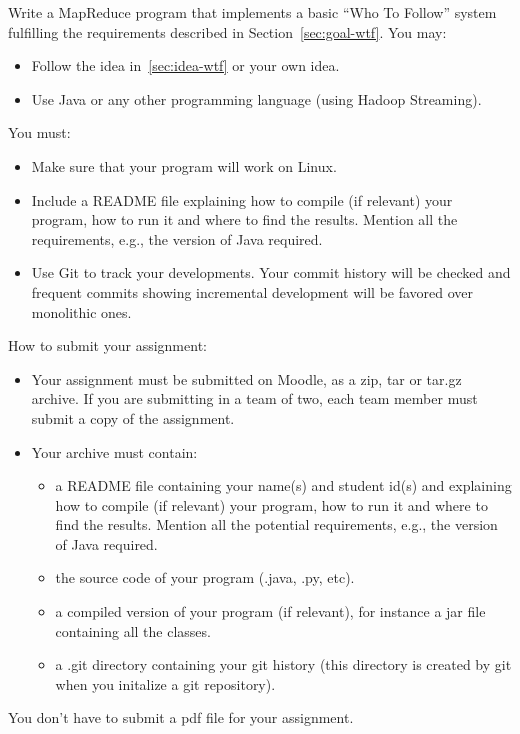 \documentclass[11pt]{article}
\begin{document}
Write a MapReduce program that implements a basic ``Who To Follow'' system
fulfilling the requirements described in Section~\ref{sec:goal-wtf}. You may:
\begin{itemize}
\item Follow the
  idea in~\ref{sec:idea-wtf} or your own idea.
\item Use Java or any other programming language (using Hadoop
  Streaming).
\end{itemize}
You must:
\begin{itemize}
\item Make sure that your program will work on Linux.
\item Include a README file explaining how to compile (if relevant)
  your program, how to run it and where to find the results. Mention all the
  requirements, e.g., the version of Java required.
\item Use Git to track your developments. Your commit history will be
  checked and frequent commits showing incremental development will be
  favored over monolithic ones.
\end{itemize}
How to submit your assignment:
\begin{itemize}
\item Your assignment must be submitted on Moodle, as a zip, tar or
  tar.gz archive. If you are submitting in a team of two, each team
  member must submit a copy of the assignment.
\item Your archive must contain:
  \begin{itemize}
  \item a README file containing your name(s) and student id(s) and
    explaining how to compile (if relevant) your program, how to run
    it and where to find the results. Mention all the potential
    requirements, e.g., the version of Java required.
  \item the source code of your program (.java, .py, etc).
  \item a compiled version of your program (if relevant), for instance
    a jar file containing all the classes.
  \item a .git directory containing your git history (this directory
    is created by git when you initalize a git repository).
  \end{itemize}
\end{itemize}
You don't have to submit a pdf file for your assignment.
\end{document}
